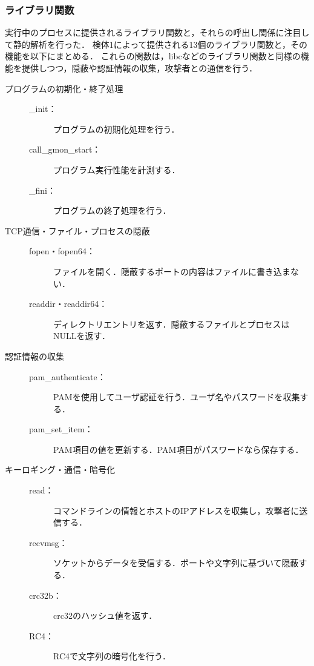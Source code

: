 \documentclass[submit,techreq,noauthor]{eco}	%
\begin{document}
\subsubsection{ライブラリ関数}
実行中のプロセスに提供されるライブラリ関数と，それらの呼出し関係に注目して静的解析を行った．
検体1によって提供される13個のライブラリ関数と，その機能を以下にまとめる．
これらの関数は，libcなどのライブラリ関数と同様の機能を提供しつつ，隠蔽や認証情報の収集，攻撃者との通信を行う．
\begin{description}

  \item [プログラムの初期化・終了処理] \mbox{}
  \begin{description}
    \item[\_init：] プログラムの初期化処理を行う．
    \item[call\_gmon\_start：] プログラム実行性能を計測する．
    \item[\_fini：]プログラムの終了処理を行う．
  \end{description}

  \item [TCP通信・ファイル・プロセスの隠蔽] \mbox{}
  \begin{description}
    \item[fopen・fopen64：] ファイルを開く．隠蔽するポートの内容はファイルに書き込まない．
    \item[readdir・readdir64：] ディレクトリエントリを返す．隠蔽するファイルとプロセスはNULLを返す．
  \end{description}

    \item [認証情報の収集] \mbox{}
  \begin{description}
    \item[pam\_authenticate：] PAMを使用してユーザ認証を行う．ユーザ名やパスワードを収集する．
    \item[pam\_set\_item：] PAM項目の値を更新する．PAM項目がパスワードなら保存する．\\
  \end{description}

  \item [キーロギング・通信・暗号化] \mbox{}
  \begin{description}
    \item[read：] コマンドラインの情報とホストのIPアドレスを収集し，攻撃者に送信する．
    \item[recvmsg：]ソケットからデータを受信する．ポートや文字列に基づいて隠蔽する．
    \item[crc32b：] crc32のハッシュ値を返す．
    \item[RC4：] RC4で文字列の暗号化を行う．\\
  \end{description}
\end{description}
\end{document}
